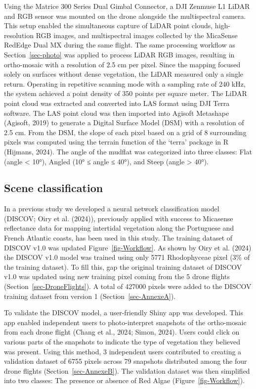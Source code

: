 \documentclass[
  letterpaper,
  DIV=11,
  numbers=noendperiod]{scrartcl}
\begin{document}
Using the Matrice 300 Series Dual Gimbal Connector, a DJI Zenmuse L1
LiDAR and RGB sensor was mounted on the drone alongside the
multispectral camera. This setup enabled the simultaneous capture of
LiDAR point clouds, high-resolution RGB images, and multispectral images
collected by the MicaSense RedEdge Dual MX during the same flight. The
same processing workflow as Section~\ref{sec-photo} was applied to
process LiDAR RGB images, resulting in ortho-mosaic with a resolution of
2.5 cm per pixel. Since the mapping focused solely on surfaces without
dense vegetation, the LiDAR measured only a single return. Operating in
repetitive scanning mode with a sampling rate of 240 kHz, the system
achieved a point density of 350 points per square meter. The LiDAR point
cloud was extracted and converted into LAS format using DJI Terra
software. The LAS point cloud was then imported into Agisoft Metashape
(Agisoft, 2019) to generate a Digital Surface Model (DSM) with a
resolution of 2.5 cm. From the DSM, the slope of each pixel based on a
grid of 8 surrounding pixels was computed using the terrain function of
the `terra' package in R (Hijmans, 2024). The angle of the mudflat was
categorized into three classes: Flat (angle \textless{} 10°), Angled
(10° ≤ angle ≤ 40°), and Steep (angle \textgreater{} 40°).

\subsection{Scene classification}\label{scene-classification}

In a previous study we developed a neural network classification model
(DISCOV; Oiry et al. (2024)), previously applied with success to
Micasense reflectance data for mapping intertidal vegetation along the
Portuguese and French Atlantic coasts, has been used in this study. The
training dataset of DISCOV v1.0 was updated Figure~\ref{fig-Workflow}.
As shown by Oiry et al. (2024) the DISCOV v1.0 model was trained using
only 5771 Rhodophyceae pixel (3\% of the training dataset). To fill
this, gap the original training dataset of DISCOV v1.0 was updated using
new training pixel coming from the 5 drone flights
(Section~\ref{sec-DroneFlights}). A total of 427000 pixels were added to
the DISCOV training dataset from version 1 (Section~\ref{sec-AnnexeA}).

To validate the DISCOV model, a user-friendly Shiny app was developed.
This app enabled independent users to photo-interpret snapshots of the
ortho-mosaic from each drone flight (Chang et al., 2024; Simon, 2024).
Users could click on various parts of the snapshots to indicate the type
of vegetation they believed was present. Using this method, 3
independent users contributed to creating a validation dataset of 6755
pixels across 79 snapshots distributed among the four drone flights
(Section~\ref{sec-AnnexeB}). The validation dataset was then simplified
into two classes: The presence or absence of Red Algae
(Figure~\ref{fig-Workflow}).
\end{document}

